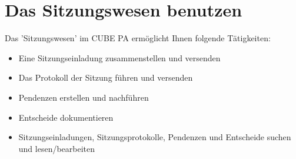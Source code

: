 \clearpage
\section{Das Sitzungswesen benutzen}

Das 'Sitzungswesen' im CUBE PA ermöglicht Ihnen folgende Tätigkeiten:


\begin{itemize}
\item
Eine Sitzungseinladung zusammenstellen und versenden
\item
Das Protokoll der Sitzung führen und versenden
\item
Pendenzen erstellen und nachführen
\item
Entscheide dokumentieren
\item
Sitzungseinladungen, Sitzungsprotokolle, Pendenzen und Entscheide suchen und lesen/bearbeiten
\end{itemize}

\vspace{2cm}

